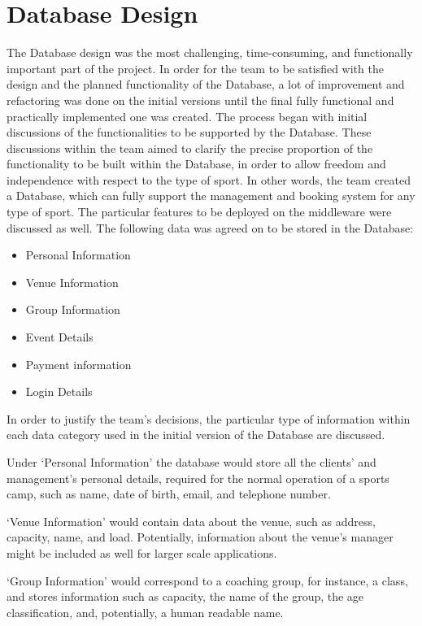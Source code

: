 \documentclass{l3proj}
\begin{document}
\section{Database Design}
\par
The Database design was the most challenging, time-consuming, and functionally important part of the project. In order for the team to be satisfied with the design and the planned functionality of the Database, a lot of improvement and refactoring was done on the initial versions until the final fully functional and practically implemented one was created. The process began with initial discussions of the functionalities to be supported by the Database. These discussions within the team aimed to clarify the precise proportion of the functionality to be built within the Database, in order to allow freedom and independence with respect to the type of sport. In other words, the team created a Database, which can fully support the management and booking system for any type of sport. The particular features to be deployed on the middleware were discussed as well. The following data was agreed on to be stored in the Database:
\begin{itemize}
	\item Personal Information
	\item Venue Information
	\item Group Information
	\item Event Details
	\item Payment information
	\item Login Details
\end{itemize}
\par In order to justify the team's decisions, the particular type of information within each data category used in the initial version of the Database are discussed.\\
\par 
Under `Personal Information' the database would store all the clients' and management's personal details, required for the normal operation of a sports camp, such as name, date of birth, email, and telephone number.\\
\par 
`Venue Information' would contain data about the venue, such as address, capacity, name, and load. Potentially, information about the venue’s manager might be included as well for larger scale applications.\\
\par 
`Group Information' would correspond to a coaching group, for instance, a class, and stores information such as capacity, the name of the group, the age classification, and, potentially, a human readable name.\\
\end{document}
